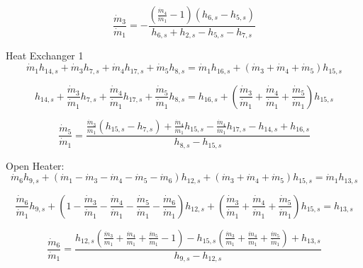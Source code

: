 \documentclass{article}
\begin{document}
\begin{equation}
\frac{\dot{m}_{3}}{\dot{m}_{1}} = -\frac{(\frac{\dot{m}_{4}}{\dot{m}_{ 1}} - 1)(h_{6,s} - h_{5,s})}{h_{6,s} + h_{2,s} - h_{5,s} - h_{7,s}}
\end{equation}


Heat Exchanger 1
\begin{equation}
\dot{m}_{ 1}h_{14,s} + \dot{m}_{ 3}h_{ 7,s} + \dot{m}_{ 4}h_{17,s} + \dot{m}_{ 5}h_{ 8,s} = \dot{m}_{ 1}h_{16,s} + (\dot{m}_{ 3} + \dot{m}_{ 4} + \dot{m}_{ 5})h_{15,s}
\end{equation}

\begin{equation}
h_{14,s} + \frac{\dot{m}_{ 3}}{\dot{m}_{ 1}}h_{ 7,s} + \frac{\dot{m}_{ 4}}{\dot{m}_{ 1}}h_{17,s} + \frac{\dot{m}_{ 5}}{\dot{m}_{ 1}}h_{ 8,s} = h_{16,s} + (\frac{\dot{m}_{ 3}}{\dot{m}_{ 1}} + \frac{\dot{m}_{ 4}}{\dot{m}_{ 1}} + \frac{\dot{m}_{ 5}}{\dot{m}_{ 1}})h_{15,s}
\end{equation}

\begin{equation}
\frac{\dot{m}_{5}}{\dot{m}_{1}} = \frac{\frac{\dot{m}_{3}}{\dot{m}_{1}}(h_{15,s} - h_{7,s}) + \frac{\dot{m}_{4}}{\dot{m}_{1}}h_{15,s} - \frac{\dot{m}_{4}}{\dot{m}_{1}}h_{17,s} - h_{14,s} + h_{16,s}}{h_{8,s} - h_{15,s}}
\end{equation}


Open Heater:
\begin{equation}
\dot{m}_{ 6}h_{ 9,s} + (\dot{m}_{ 1} - \dot{m}_{ 3} - \dot{m}_{ 4} - \dot{m}_{ 5} - \dot{m}_{ 6})h_{12,s} + (\dot{m}_{ 3} + \dot{m}_{ 4} + \dot{m}_{ 5})h_{15,s} = \dot{m}_{ 1}h_{13,s}
\end{equation}

\begin{equation}
\frac{\dot{m}_{ 6}}{\dot{m}_{ 1}}h_{ 9,s} + (1 - \frac{\dot{m}_{ 3}}{\dot{m}_{ 1}} - \frac{\dot{m}_{ 4}}{\dot{m}_{ 1}} - \frac{\dot{m}_{ 5}}{\dot{m}_{ 1}} - \frac{\dot{m}_{ 6}}{\dot{m}_{ 1}})h_{12,s} + (\frac{\dot{m}_{ 3}}{\dot{m}_{ 1}} + \frac{\dot{m}_{ 4}}{\dot{m}_{ 1}} + \frac{\dot{m}_{ 5}}{\dot{m}_{ 1}})h_{15,s} = h_{13,s}
\end{equation}

\begin{equation}
\frac{\dot{m}_{ 6}}{\dot{m}_{ 1}} = \frac{h_{12,s}(\frac{\dot{m}_{3}}{\dot{m}_{1}} + \frac{\dot{m}_{4}}{\dot{m}_{1}} + \frac{\dot{m}_{5}}{\dot{m}_{1}} - 1) - h_{15,s}(\frac{\dot{m}_{3}}{\dot{m}_{1}} + \frac{\dot{m}_{4}}{\dot{m}_{1}} + \frac{\dot{m}_{5}}{\dot{m}_{1}}) + h_{13,s}}{h_{9,s} - h_{12,s}}
\end{equation}
\end{document}
